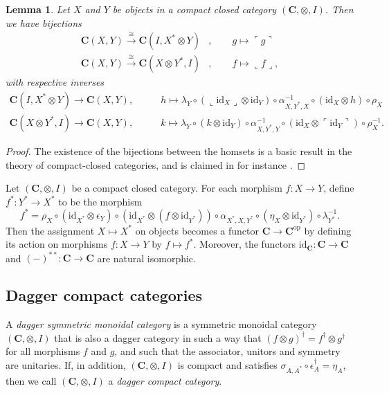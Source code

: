 \documentclass[12pt]{tac}
\newtheorem{lemma}[theorem]{Lemma}
\theoremstyle{definition}
\theoremstyle{remark}
\newcommand{\<}{\langle}
\renewcommand{\>}{\rangle}
\renewcommand{\:}{\colon}
\newcommand{\op}{\mathrm{op}}
\newcommand{\id}{\mathrm{id}}
\renewcommand{\name}[1]{\ulcorner #1\urcorner}
\newcommand{\coname}[1]{\llcorner #1\lrcorner}
\begin{document}
\begin{lemma}\label{lem:epsilon}
   Let $X$ and $Y$ be objects in a compact closed category $(\mathbf C,\otimes,I)$.
Then we have bijections
\begin{align*}
\mathbf C(X,Y)\xrightarrow{\cong}\mathbf C(I,X^*\otimes Y) & , \qquad g\mapsto \name g\\
 \mathbf C(X,Y)\xrightarrow{\cong}\mathbf C(X\otimes Y^*,I) & , \qquad f\mapsto\coname f,
\end{align*}
with respective inverses
\begin{align*}\mathbf C(I,X^*\otimes Y)\to\mathbf C(X,Y), & \qquad h\mapsto\lambda_Y\circ (\coname{\id_X}\otimes\id_Y)\circ\alpha_{X,Y^*,X}^ {-1}\circ(\id_X\otimes h)\circ\rho_X\\
    \mathbf C(X\otimes Y^*,I)\to\mathbf C(X,Y),& \qquad k\mapsto \lambda_Y\circ (k\otimes\id_{Y})\circ\alpha_{X,Y^*,Y}^{-1}\circ(\id_X\otimes\name{\id_Y})\circ\rho_X^{-1}.
\end{align*}
\end{lemma}
\begin{proof}
The existence of the bijections between the homsets is a basic result in the theory of compact-closed categories, and is claimed in for instance \cite{Kelly-Laplaza}. 
\end{proof}
    Let $(\mathbf C,\otimes,I)$ be a compact closed category. For each morphism $f:X\to Y$, define $f^*:Y^*\to X^*$ to be the morphism
    \[ f^*=\rho_X\circ (\id_{X^*}\otimes\epsilon_Y)\circ(\id_{X^*}\otimes
    (f\otimes\id_{Y^*}))\circ\alpha_{X^*,X,Y^*}\circ(\eta_X\otimes\id_{Y^*})\circ\lambda_{Y^*}^{-1}.\]
      Then the assignment $X\mapsto X^*$ on objects becomes a functor $\mathbf C\to\mathbf C^\op$ by defining its action on morphisms $f:X\to Y$ by $f\mapsto f^*$. Moreover, the functors $\id_\mathbf C:\mathbf C\to\mathbf C$ and $(-)^{**}:\mathbf C\to\mathbf C$ are natural isomorphic.

\subsection{Dagger compact categories}


    A \emph{dagger symmetric monoidal category} is a symmetric monoidal category $(\mathbf C,\otimes, I)$ that is also a dagger category in such a way that $(f\otimes g)^\dag=f^\dag\otimes g^\dag$ for all morphisms $f$ and $g$, and such that the associator, unitors and symmetry are unitaries. If, in addition, $(\mathbf C,\otimes,I)$ is compact and satisfies $\sigma_{A,A^* }\circ \epsilon_A^\dag=\eta_{A}$, then we call $(\mathbf C,\otimes,I)$ a \emph{dagger compact category}.
\end{document}

